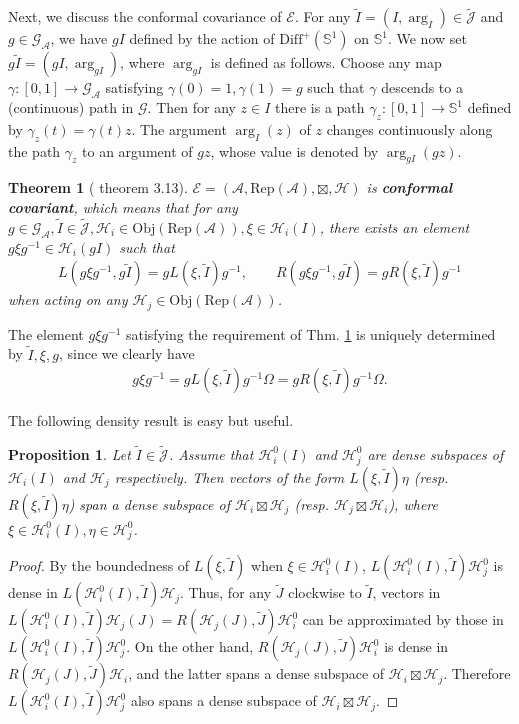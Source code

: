 \documentclass[11pt,b5paper,notitlepage]{article}
\theoremstyle{definition}
\theoremstyle{plain}
\newtheorem{thm}[df]{Theorem}
\newtheorem{pp}[df]{Proposition}
\newcommand{\mc}{\mathcal}
\newcommand{\wtd}{\widetilde}
\newcommand{\Diffp}{\mathrm{Diff}^+}
\newcommand{\GA}{\mathscr G_{\mathcal A}}
\newcommand{\scr}{\mathscr}
\newcommand{\Jtd}{\widetilde{\mathcal J}}
\newcommand{\RepA}{\mathrm{Rep}(\mc A)}
\newcommand{\mbb}{\mathbb}
\newcommand{\Obj}{\mathrm{Obj}}
\numberwithin{equation}{subsection}
\begin{document}
Next, we discuss the conformal covariance of $\scr E$. For any $\wtd I=(I,\arg_I)\in\Jtd$ and $g\in\GA$, we have $gI$ defined by the action of $\Diffp(\mbb S^1)$ on $\mbb S^1$. We now set $g\wtd I=(gI,\arg_{gI})$, where $\arg_{gI}$ is defined as follows. Choose any map $\gamma:[0,1]\rightarrow\GA$ satisfying $\gamma(0)=1,\gamma(1)=g$ such that $\gamma$ descends to a (continuous) path in $\scr G$. Then for any $z\in I$ there is a path $\gamma_z:[0,1]\rightarrow \mbb S^1$ defined by $\gamma_z(t)=\gamma(t)z$. The argument $\arg_I(z)$ of $z$ changes continuously along the path $\gamma_z$ to an argument of $gz$, whose value is denoted by $\arg_{gI}(gz)$.  

\begin{thm}[\cite{Gui21a} theorem 3.13]\label{lb100}
	$\scr E=(\mc A,\RepA,\boxtimes,\mc H)$ is \textbf{conformal covariant}, which means that for any $g\in\GA,\wtd I\in\wtd{\mc J},\mc H_i\in\Obj(\RepA),\xi\in\mc H_i(I)$, there exists an element $g\xi g^{-1}\in\mc H_i(g I)$ such that
	\begin{align}
	L(g\xi g^{-1},g\wtd I)=gL(\xi,\wtd I)g^{-1},\qquad R(g\xi g^{-1},g\wtd I)=gR(\xi,\wtd I)g^{-1}\label{eq15}
	\end{align}
	when acting on any $\mc H_j\in\Obj(\RepA)$.
\end{thm}
The element $g\xi g^{-1}$ satisfying the requirement of Thm. \ref{lb100} is uniquely determined by $\wtd I,\xi,g$, since we clearly have
\begin{align}
g\xi g^{-1}=gL(\xi,\wtd I)g^{-1}\Omega=gR(\xi,\wtd I)g^{-1}\Omega.
\end{align}


The following density result is easy but useful.

\begin{pp}\label{lb2}
Let $\wtd I\in\Jtd$. Assume that  $\mc H_i^0(I)$ and $\mc H_j^0$ are dense subspaces of $\mc H_i(I)$ and $\mc H_j$ respectively. Then vectors of the form $L(\xi,\wtd I)\eta$ (resp. $R(\xi,\wtd I)\eta$)  span a dense subspace of $\mc H_i\boxtimes\mc H_j$ (resp. $\mc H_j\boxtimes\mc H_i$), where $\xi\in\mc H_i^0(I),\eta\in\mc H_j^0$.
\end{pp}
\begin{proof}
By the boundedness of $L(\xi,\wtd I)$ when $\xi\in\mc H_i^0(I)$, $L(\mc H_i^0(I),\wtd I)\mc H_j^0$ is dense in 	$L(\mc H_i^0(I),\wtd I)\mc H_j$. Thus, for any $\wtd J$ clockwise to $\wtd I$, vectors in $L(\mc H_i^0(I),\wtd I)\mc H_j(J)=R(\mc H_j(J),\wtd J)\mc H_i^0$ can be approximated by those in $L(\mc H_i^0(I),\wtd I)\mc H_j^0$. On the other hand, $R(\mc H_j(J),\wtd J)\mc H_i^0$ is dense in $R(\mc H_j(J),\wtd J)\mc H_i$, and the latter spans a dense subspace of $\mc H_i\boxtimes\mc H_j$. Therefore $L(\mc H_i^0(I),\wtd I)\mc H_j^0$ also spans a dense subspace of $\mc H_i\boxtimes\mc H_j$.
\end{proof}
\end{document}

